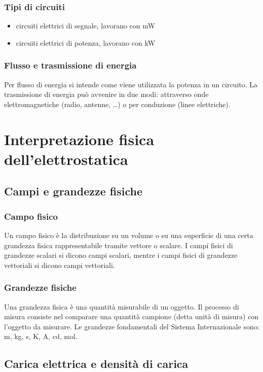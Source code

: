 \documentclass[a4paper]{article}
\begin{document}
\subsubsection*{Tipi di circuiti}
\begin{itemize}
	\item circuiti elettrici di segnale, lavorano con mW
	\item circuiti elettrici di potenza, lavorano con kW
\end{itemize}

\subsubsection*{Flusso e trasmissione di energia}
Per flusso di energia si intende come viene utilizzata la potenza in un circuito. La trasmissione di energia può avvenire in due
modi: attraverso onde elettromagnetiche (radio, antenne, \dots) o per conduzione (linee elettriche).

\newpage

\section{Interpretazione fisica dell'elettrostatica}
\subsection{Campi e grandezze fisiche}
\subsubsection*{Campo fisico}
Un campo fisico è la distribuzione su un volume o su una superficie di una certa grandezza fisica rappresentabile tramite vettore
o scalare. I campi fisici di grandezze scalari si dicono campi scalari, mentre i campi fisici di grandezze vettoriali si dicono
campi vettoriali.

\subsubsection*{Grandezze fisiche}
Una grandezza fisica è una quantità misurabile di un oggetto. Il processo di misura consiste nel comparare una quantità campione
(detta unità di misura) con l'oggetto da misurare. Le grandezze fondamentali del Sistema Internazionale sono: m, kg, s, K, A, cd,
mol.

\subsection{Carica elettrica e densità di carica}
\end{document}
